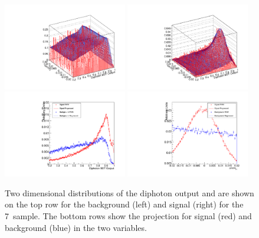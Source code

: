 \begin{figure}
  \includegraphics[width=0.48\textwidth]{ch4_selec_and_cats/plots/sideband_bkg_7TeV.pdf}
  \includegraphics[width=0.48\textwidth]{ch4_selec_and_cats/plots/sideband_sig_7TeV.pdf} \\
  \includegraphics[width=0.48\textwidth]{ch4_selec_and_cats/plots/sideband_diphobdt_7TeV.pdf}
  \includegraphics[width=0.48\textwidth]{ch4_selec_and_cats/plots/sideband_dmom_7TeV.pdf} \\
  \caption{Two dimensional distributions of the diphoton \BDT output and \dmom are shown on the top row for the background (left) and signal (right) for the 7~\TeV sample. The bottom rows show the projection for signal (red) and background (blue) in the two variables.}
  \label{fig:sideband_inputs}
\end{figure}

